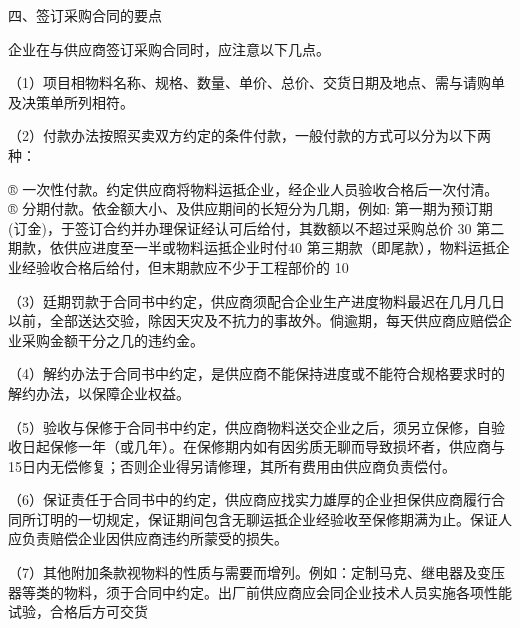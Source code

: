 四、签订采购合同的要点

    企业在与供应商签订采购合同时，应注意以下几点。

    （1）项目相物料名称、规格、数量、单价、总价、交货日期及地点、需与请购单及决策单所列相符。

    （2）付款办法按照买卖双方约定的条件付款，一般付款的方式可以分为以下两种：

    ® 一次性付款。约定供应商将物料运抵企业，经企业人员验收合格后一次付清。
    ® 分期付款。依金额大小、及供应期间的长短分为几期，例如:
    第一期为预订期(订金)，于签订合约并办理保证经认可后给付，其数额以不超过采购总价 30%
    第二期款，依供应进度至一半或物料运抵企业时付40%
    第三期款（即尾款），物料运抵企业经验收合格后给付，但末期款应不少于工程部价的 10%

    （3）廷期罚款于合同书中约定，供应商须配合企业生产进度物料最迟在几月几日以前，全部送达交验，除因天灾及不抗力的事故外。倘逾期，每天供应商应赔偿企业采购金额干分之几的违约金。

    （4）解约办法于合同书中约定，是供应商不能保持进度或不能符合规格要求时的解约办法，以保障企业权益。

    （5）验收与保修于合同书中约定，供应商物料送交企业之后，须另立保修，自验收日起保修一年（或几年）。在保修期内如有因劣质无聊而导致损坏者，供应商与15日内无偿修复；否则企业得另请修理，其所有费用由供应商负责偿付。

    （6）保证责任于合同书中的约定，供应商应找实力雄厚的企业担保供应商履行合同所订明的一切规定，保证期间包含无聊运抵企业经验收至保修期满为止。保证人应负责赔偿企业因供应商违约所蒙受的损失。

    （7）其他附加条款视物料的性质与需要而增列。例如：定制马克、继电器及变压器等类的物料，须于合同中约定。出厂前供应商应会同企业技术人员实施各项性能试验，合格后方可交货
